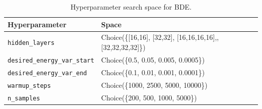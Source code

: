 \begin{table}[t]
\centering
\small
\caption{Hyperparameter search space for BDE.}
\label{tab:bde_search_space}
\begin{tabular}{ll}
\toprule
Hyperparameter & Space \\
\midrule
\texttt{hidden\_layers} & Choice(\{[16,16], [32,32], [16,16,16,16],\linebreak [32,32,32], [32,32,32,32]\}) \\
\texttt{desired\_energy\_var\_start} & Choice(\{0.5, 0.05, 0.005, 0.0005\}) \\
\texttt{desired\_energy\_var\_end} & Choice(\{0.1, 0.01, 0.001, 0.0001\}) \\
\texttt{warmup\_steps} & Choice(\{1000, 2500, 5000, 10000\}) \\
\texttt{n\_samples} & Choice(\{200, 500, 1000, 5000\}) \\
\bottomrule
\end{tabular}
\end{table}
